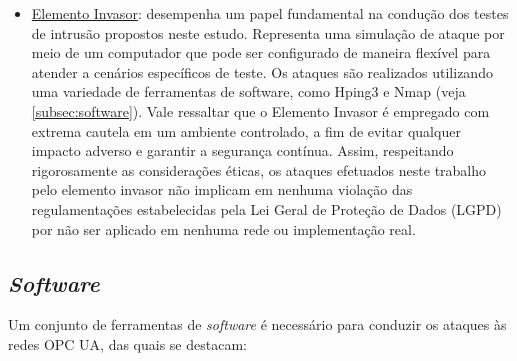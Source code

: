 \begin{itemize}
        \item \underline{Elemento Invasor}: desempenha um papel fundamental na condução dos testes de intrusão propostos neste estudo. Representa uma simulação de ataque por meio de um computador que pode ser configurado de maneira flexível para atender a cenários específicos de teste. Os ataques são realizados utilizando uma variedade de ferramentas de software, como Hping3 e Nmap (veja \autoref{subsec:software}). Vale ressaltar que o Elemento Invasor é empregado com extrema cautela em um ambiente controlado, a fim de evitar qualquer impacto adverso e garantir a segurança contínua. Assim, respeitando rigorosamente as considerações éticas, os ataques efetuados neste trabalho pelo elemento invasor não implicam em nenhuma violação das regulamentações estabelecidas pela Lei Geral de Proteção de Dados (LGPD) por não ser aplicado em nenhuma rede ou implementação real.
    \end{itemize}
    
    \subsection{\textit{Software}} \label{subsec:software}

    Um conjunto de ferramentas de \textit{software} é necessário para conduzir os ataques às redes OPC UA, das quais se destacam:

